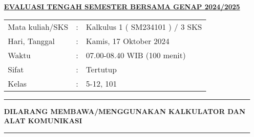 \documentclass[10pt,openany,a4paper]{article}
\begin{document}
\begin{center}
    {\underline{\textbf{\MakeUppercase{Evaluasi Tengah Semester Bersama Genap 2024/2025}}}}
\end{center}

\begin{center}
    \begin{tabular}{lcl}
        Mata kuliah/SKS & : & Kalkulus 1 ( SM234101 ) / 3 SKS \\
        Hari, Tanggal   & : & Kamis, 17 Oktober 2024          \\
        Waktu           & : & 07.00-08.40 WIB (100 menit)     \\
        Sifat           & : & Tertutup                        \\
        Kelas           & : & 5-12, 101
    \end{tabular}
\end{center}

\noindent\rule{\textwidth}{2.pt}

\setlength{\parindent}{5pt}
\setlength{\parindent}{5pt}
\setlength{\parindent}{5pt}
\par \textbf{\MakeUppercase{dilarang membawa/menggunakan kalkulator dan alat komunikasi}}
\par {}
\noindent\rule{\textwidth}{2.pt}
\end{document}
